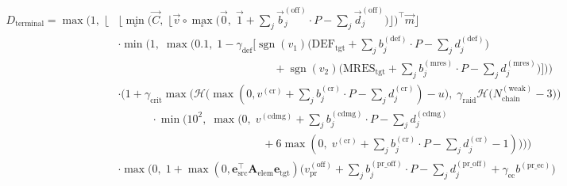\documentclass[twocolumn,10pt]{article}
\DeclareMathOperator{\sgn}{sgn}
\begin{document}
\begin{strip}
\begin{equation}
\label{eq:master_monolithic}
\begin{aligned}
  D_{\text{terminal}} = \max \Biggl( 1, \; \Biggl\lfloor & 
  \bigg\lfloor \min_\circ \Big( \vec{C}, \; \big\lfloor \vec{v} \circ \max_\circ \big( \vec{0}, \; \vec{1} + \sum_j \vec{b}^{(\text{off})}_j \cdot P - \sum_j \vec{d}^{(\text{off})}_j \big) \big\rfloor \Big)^\top \vec{m} \bigg\rfloor \\
  & \cdot \min \bigg( 1, \; \max \Big( 0.1, \; 1 - \gamma_{\text{def}} \Big[ \sgn(v_1) \big( \text{DEF}_{\text{tgt}} + \sum_j b^{(\text{def})}_j \cdot P - \sum_j d^{(\text{def})}_j \big) \\
  & \qquad\qquad\qquad\qquad\qquad\qquad\qquad + \sgn(v_2) \big( \text{MRES}_{\text{tgt}} + \sum_j b^{(\text{mres})}_j \cdot P - \sum_j d^{(\text{mres})}_j \big) \Big] \Big) \bigg) \\
  & \cdot \bigg( 1 + \gamma_{\text{crit}} \max \Big( \mathcal{H}\big( \max(0, v^{(\text{cr})} + \sum_j b^{(\text{cr})}_j \cdot P - \sum_j d^{(\text{cr})}_j) - u \big), \; \gamma_{\text{raid}} \mathcal{H}\big( N^{(\text{weak})}_{\text{chain}} - 3 \big) \Big) \\
  & \qquad\quad \cdot \min \Big( 10^2, \; \max \big( 0, \; v^{(\text{cdmg})} + \sum_j b^{(\text{cdmg})}_j \cdot P - \sum_j d^{(\text{cdmg})}_j \\
  & \qquad\qquad\qquad\qquad\qquad\qquad\quad + 6 \max(0, \; v^{(\text{cr})} + \sum_j b^{(\text{cr})}_j \cdot P - \sum_j d^{(\text{cr})}_j - 1) \big) \Big) \bigg) \\
  & \cdot \max \bigg( 0, \; 1 + \max(0, \mathbf{e}_{\text{src}}^\top \mathbf{A}_{\text{elem}} \mathbf{e}_{\text{tgt}}) \Big( v_{\text{pr}}^{(\text{off})} + \sum_j b_j^{(\text{pr\_off})} \cdot P - \sum_j d_j^{(\text{pr\_off})} + \gamma_{\text{ec}} b^{(\text{pr\_ec})} \Big) \\

\end{aligned}
\end{equation}
\end{strip}
\end{document}
